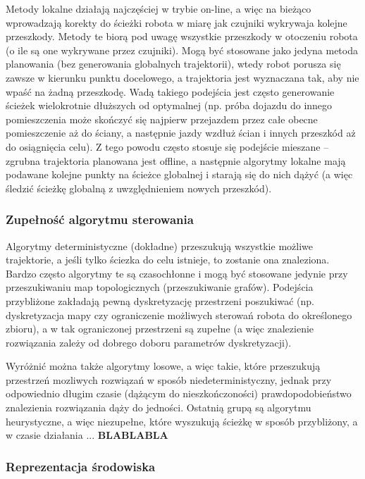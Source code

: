 Metody lokalne działają najczęściej w trybie on-line, a więc na bieżąco wprowadzają korekty
do ścieżki robota w miarę jak czujniki wykrywaja kolejne przeszkody. Metody te biorą
pod uwagę wszystkie przeszkody w otoczeniu robota (o ile są one wykrywane przez czujniki).
Mogą być stosowane jako jedyna metoda planowania (bez generowania globalnych trajektorii),
wtedy robot porusza się zawsze w kierunku punktu docelowego, a trajektoria jest wyznaczana
tak, aby nie wpaść na żadną przeszkodę. Wadą takiego podejścia jest często generowanie
ścieżek wielokrotnie dłuższych od optymalnej (np. próba dojazdu do innego pomieszczenia
może skończyć się najpierw przejazdem przez całe obecne pomieszczenie aż do ściany, a następnie
jazdy wzdłuż ścian i innych przeszkód aż do osiągnięcia celu). Z tego powodu często
stosuje się podejście mieszane -- zgrubna trajektoria planowana jest offline, a następnie
algorytmy lokalne mają podawane kolejne punkty na ścieżce globalnej i starają się do nich
dążyć (a więc śledzić ścieżkę globalną z uwzględnieniem nowych przeszkód).

\subsubsection{Zupełność algorytmu sterowania}

Algorytmy deterministyczne (dokładne) przeszukują wszystkie możliwe trajektorie,
a jeśli tylko ściezka do celu istnieje, to zostanie ona znaleziona. Bardzo często algorytmy
te są czasochłonne i mogą być stosowane jedynie przy przeszukiwaniu map topologicznych
(przeszukiwanie grafów). Podejścia przybliżone zakładają pewną dyskretyzację przestrzeni
poszukiwać (np. dyskretyzacja mapy czy ograniczenie możliwych sterowań robota do określonego
zbioru), a w tak ograniczonej przestrzeni są zupełne (a więc znalezienie rozwiązania
zależy od dobrego doboru parametrów dyskretyzacji).

Wyróżnić można także algorytmy losowe, a więc takie, które przeszukują przestrzeń
mozliwych rozwiązań w sposób niedeterministyczny, jednak przy odpowiednio długim czasie
(dążącym do nieszkończoności) prawdopodobieństwo znalezienia rozwiązania dąży do jedności.
Ostatnią grupą są algorytmu heurystyczne, a więc niezupełne, które wyszukują ścieżkę
w sposób przybliżony, a w czasie działania ... \textbf{BLABLABLA}

\subsubsection{Reprezentacja środowiska}


